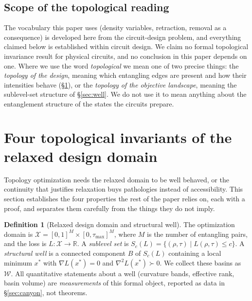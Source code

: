 \documentclass[twocolumn,aps,prl,superscriptaddress,showkeys]{revtex4-2}
\theoremstyle{plain}
\theoremstyle{definition}
\newtheorem{definition}{Definition}
\begin{document}
\subsection{Scope of the topological reading}

The vocabulary this paper uses (density variables, retraction, removal as a consequence) is developed here from the circuit-design problem, and everything claimed below is established within circuit design. We claim no formal topological invariance result for physical circuits, and no conclusion in this paper depends on one. Where we use the word \emph{topological} we mean one of two precise things: the \emph{topology of the design}, meaning which entangling edges are present and how their intensities behave (\S\ref{sec:invariants}), or the \emph{topology of the objective landscape}, meaning the sublevel-set structure of \S\ref{sec:well}. We do not use it to mean anything about the entanglement structure of the states the circuits prepare.

\section{Four topological invariants of the relaxed design domain}
\label{sec:invariants}

Topology optimization needs the relaxed domain to be well behaved, or the continuity that justifies relaxation buys pathologies instead of accessibility. This section establishes the four properties the rest of the paper relies on, each with a proof, and separates them carefully from the things they do not imply.

\begin{definition}[Relaxed design domain and structural well]
\label{def:well}
The optimization domain is $\mathcal{X}=[0,1]^M\times[0,\tau_{\max}]^M$, where $M$ is the number of entangling pairs, and the loss is $L:\mathcal{X}\to\mathbb{R}$. A \emph{sublevel set} is $S_c(L)=\{(\rho,\tau)\mid L(\rho,\tau)\le c\}$. A \emph{structural well} is a connected component $B$ of $S_c(L)$ containing a local minimum $x^*$ with $\nabla L(x^*)=0$ and $\nabla^2 L(x^*)\succ 0$. We collect these basins as $\mathcal{W}$. All quantitative statements about a well (curvature bands, effective rank, basin volume) are \emph{measurements} of this formal object, reported as data in \S\ref{sec:canyon}, not theorems.
\end{definition}
\end{document}
